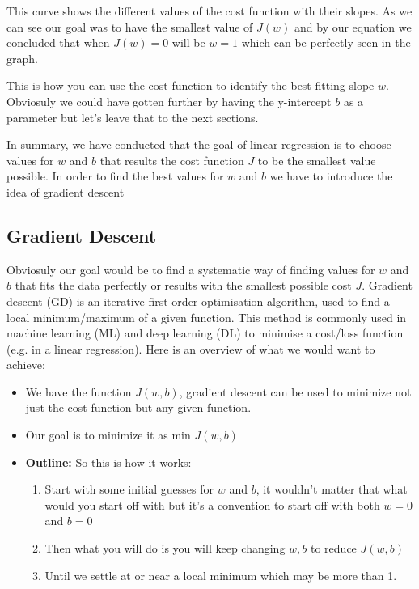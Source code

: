 This curve shows the different values of the cost function with their slopes. 
As we can see our goal was to have the smallest value of $J(w)$ and by our equation we concluded that when $J(w)=0$ will be $w=1$ which can be perfectly seen in the graph. 

This is how you can use the cost function to identify the best fitting slope $w$. 
Obviosuly we could have gotten further by having the y-intercept $b$ as a parameter but let's leave that to the next sections. 

In summary, we have conducted that the goal of linear regression is to choose values for $w$ and $b$ that results the cost function $J$ to be the smallest value possible. 
In order to find the best values for $w$ and $b$ we have to introduce the idea of gradient descent

\subsection{Gradient Descent}
Obviosuly our goal would be to find a systematic way of finding values for $w$ and $b$ that fits the data perfectly or results with the smallest possible cost $J$.
Gradient descent (GD) is an iterative first-order optimisation algorithm, used to find a local minimum/maximum of a given function. This method is commonly used in machine learning (ML) and deep learning (DL) to minimise a cost/loss function (e.g. in a linear regression).
Here is an overview of what we would want to achieve: 
\begin{itemize}
  \item We have the function $J(w,b)$, gradient descent can be used to minimize not just the cost function but any given function. 
  \item Our goal is to minimize it as min $J(w,b)$
  \item \textbf{Outline: } So this is how it works: 
  \begin{enumerate}
    \item Start with some initial guesses for $w$ and $b$, it wouldn't matter that what would you start off with but it's a convention to start off with both $w=0$ and $b=0$
    \item Then what you will do is you will keep changing $w,b$ to reduce $J(w,b)$
    \item Until we settle at or near a local minimum which may be more than 1.
  \end{enumerate}
\end{itemize}

